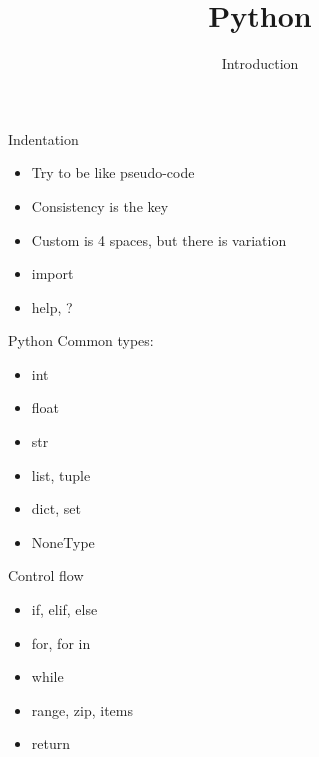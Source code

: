 
\title{Python}
\subtitle{Introduction}




\begin{frame}
  \titlepage
\end{frame}

\begin{frame}
\end{frame}

\begin{frame}
\end{frame}

\begin{frame}
\end{frame}

\begin{frame}{Indentation}
  \begin{itemize}
  \item Try to be like pseudo-code
  \item Consistency is the key
  \item Custom is 4 spaces, but there is variation
  \end{itemize}
\end{frame}

\begin{frame}
  \begin{itemize}
  \item import
  \item help, ?
  \end{itemize}
\end{frame}

\begin{frame}{Python}
  Common types:
  \begin{itemize}
  \item int
  \item float
  \item str
  \item list, tuple
  \item dict, set
  \item NoneType
  \end{itemize}
\end{frame}

\begin{frame}{Control flow}
  \begin{itemize}
  \item if, elif, else
  \item for, for in
  \item while
  \item range, zip, items
  \item return
  \end{itemize}
\end{frame}

